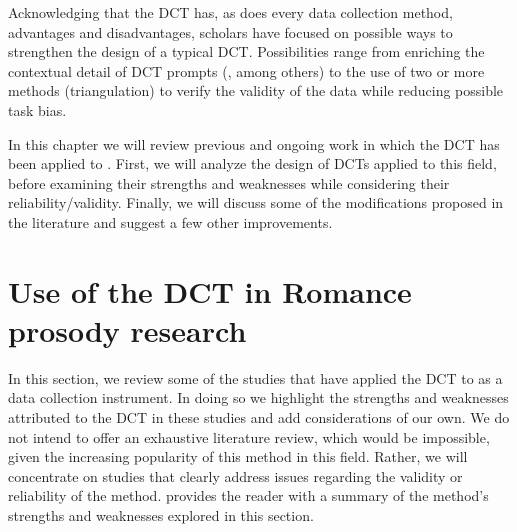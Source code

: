 \documentclass[output=paper]{LSP/langsci}
\begin{document}
Acknowledging that the DCT has, as does every data collection method, advantages and disadvantages, scholars have focused on possible ways to strengthen the design of a typical DCT. Possibilities range from enriching the contextual detail of DCT prompts (\citealt{Billmyer2000,Rose2000,Cohen2003,Schauer2004,McLean2005}, among others) to the use of two or more methods (triangulation) \citep{Wiersma1986} to verify the validity of the data while reducing possible task bias.

In this chapter we will review previous and ongoing work in which the DCT has been applied to  . First, we will analyze the design of DCTs applied to this field, before examining their strengths and weaknesses while considering their reliability/validity. Finally, we will discuss some of the modifications proposed in the literature and suggest a few other improvements.  

\section{Use of the DCT in Romance prosody research}
\label{sec:van:2}
In this section, we review some of the studies that have applied the DCT to   as a data collection instrument. In doing so we highlight the strengths and weaknesses attributed to the DCT in these studies and add considerations of our own. We do not intend to offer an exhaustive literature review, which would be impossible, given the increasing popularity of this method in this field. Rather, we will concentrate on studies that clearly address issues regarding the validity or reliability of the method.  provides the reader with a summary of the method’s strengths and weaknesses explored in this section.
\end{document}
